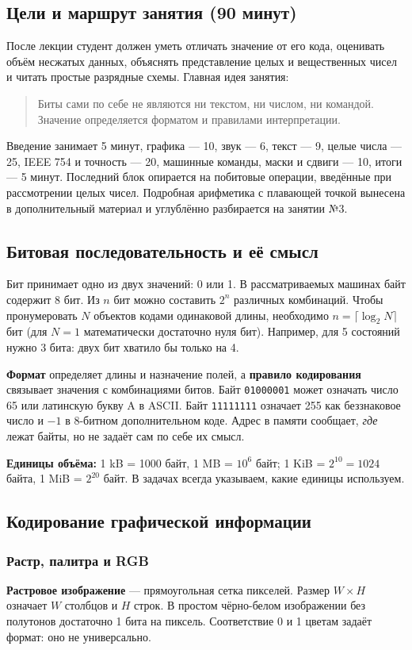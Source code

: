 \label{lecture02}
\subsection*{Цели и маршрут занятия (90 минут)}
После лекции студент должен уметь отличать значение от его кода, оценивать
объём несжатых данных, объяснять представление целых и вещественных чисел
и читать простые разрядные схемы. Главная идея занятия:
\begin{quote}
Биты сами по себе не являются ни текстом, ни числом, ни командой.
Значение определяется форматом и правилами интерпретации.
\end{quote}
Введение занимает 5 минут, графика --- 10, звук --- 6, текст --- 9,
целые числа --- 25, IEEE 754 и точность --- 20, машинные команды,
маски и сдвиги --- 10, итоги --- 5 минут. Последний блок опирается
на побитовые операции, введённые при рассмотрении целых чисел.
Подробная арифметика с плавающей точкой вынесена в дополнительный материал
и углублённо разбирается на занятии №3.

\subsection{Битовая последовательность и её смысл}
Бит принимает одно из двух значений: 0 или 1. В рассматриваемых машинах
байт содержит 8 бит. Из $n$ бит можно составить $2^n$ различных комбинаций.
Чтобы пронумеровать $N$ объектов кодами одинаковой длины, необходимо
$n=\lceil\log_2 N\rceil$ бит (для $N=1$ математически достаточно нуля бит).
Например, для 5 состояний нужно 3 бита: двух бит хватило бы только на 4.

\textbf{Формат} определяет длины и назначение полей, а \textbf{правило
кодирования} связывает значения с комбинациями битов. Байт
\texttt{01000001} может означать число 65 или латинскую букву A в ASCII.
Байт \texttt{11111111} означает 255 как беззнаковое число и $-1$ в
8-битном дополнительном коде. Адрес в памяти сообщает, \emph{где} лежат
байты, но не задаёт сам по себе их смысл.

\textbf{Единицы объёма:} 1 kB = 1000 байт, 1 MB = $10^6$ байт;
1 KiB = $2^{10}=1024$ байта, 1 MiB = $2^{20}$ байт.
В задачах всегда указываем, какие единицы используем.

\subsection{Кодирование графической информации}
\subsubsection*{Растр, палитра и RGB}
\textbf{Растровое изображение} --- прямоугольная сетка пикселей.
Размер $W\times H$ означает $W$ столбцов и $H$ строк.
В простом чёрно-белом изображении без полутонов достаточно 1 бита
на пиксель. Соответствие 0 и 1 цветам задаёт формат: оно не универсально.

